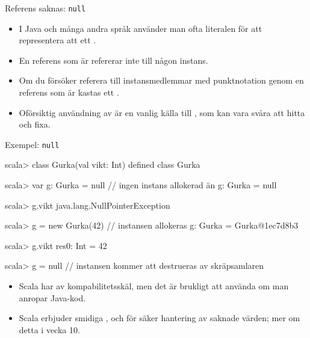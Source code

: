 \begin{Slide}{Referens saknas: \texttt{null}}
\begin{itemize}
\item I Java och många andra språk använder man ofta literalen  för att representera att ett .

\item En referens som är  refererar inte till någon instans.

\item Om du försöker referera till instansmedlemmar med punktnotation genom en referens som är  kastas ett  .

\item Oförsiktig användning av  är en vanlig källa till , som kan vara svåra att hitta och fixa.

\end{itemize}
\end{Slide}


\begin{Slide}{Exempel: \texttt{null}}
\begin{REPL}
scala> class Gurka(val vikt: Int)
defined class Gurka

scala> var g: Gurka = null        // ingen instans allokerad än
g: Gurka = null

scala> g.vikt
java.lang.NullPointerException

scala> g = new Gurka(42)          // instansen allokeras
g: Gurka = Gurka@1ec7d8b3

scala> g.vikt
res0: Int = 42

scala> g = null         // instansen kommer att destrueras av skräpsamlaren
\end{REPL}

\begin{itemize} \SlideFontSmall
\item Scala har  av kompabilitetsskäl, men det är brukligt att  använda  om man anropar Java-kod.

\item Scala erbjuder smidiga ,  och  för säker hantering av saknade värden; mer om detta i vecka 10.



\end{itemize}
\end{Slide}







